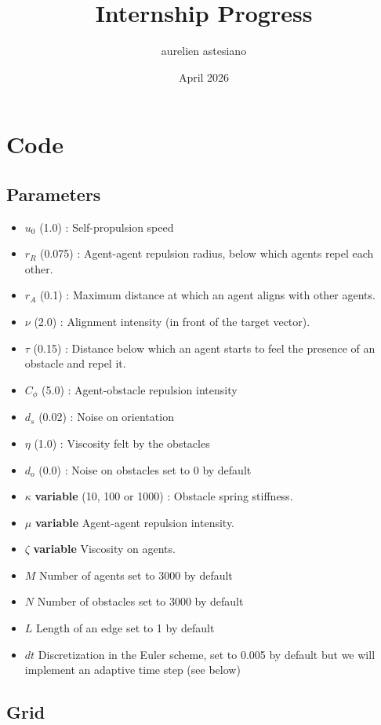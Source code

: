 \documentclass{article}
\title{Internship Progress}
\author{aurelien astesiano}
\date{April 2026}
\begin{document}
\maketitle

\section{Code}

\subsection{Parameters}

\begin{itemize}
\item $u_0$ (1.0) : Self-propulsion speed
\item $r_R$ (0.075) : Agent-agent repulsion radius, below which agents repel each other.
\item $r_A$ (0.1) : Maximum distance at which an agent aligns with other agents.
\item $\nu$ (2.0) : Alignment intensity (in front of the target vector).
\item $\tau$ (0.15) : Distance below which an agent starts to feel the presence of an obstacle and repel it.
\item $C_{\phi}$ (5.0) : Agent-obstacle repulsion intensity
\item $d_s$ (0.02) : Noise on orientation
\item $\eta$ (1.0) : Viscosity felt by the obstacles
\item $d_o$ (0.0) : Noise on obstacles set to 0 by default
\item $\kappa$ \textbf{variable} (10, 100 or 1000) : Obstacle spring stiffness.
\item $\mu$ \textbf{variable} Agent-agent repulsion intensity.
\item $\zeta$ \textbf{variable} Viscosity on agents.
\item $M$ Number of agents set to 3000 by default
\item $N$ Number of obstacles set to 3000 by default
\item $L$ Length of an edge set to 1 by default
\item $dt$ Discretization in the Euler scheme, set to 0.005 by default but we will implement an adaptive time step (see below)
\end{itemize}

\subsection{Grid}
\end{document}
